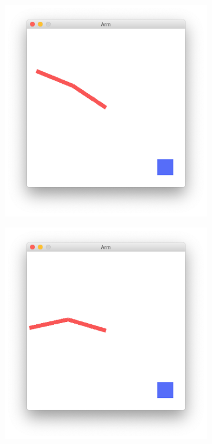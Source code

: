 \documentclass{article}
\begin{document}
\begin{figure}[t]
  \centering
  \begin{subfigure}{.225\textwidth}
    \includegraphics[width=\linewidth]{arm0.png}
  \end{subfigure}
  \begin{subfigure}{.225\textwidth}
    \includegraphics[width=\linewidth]{arm1.png}

\end{subfigure}
\end{figure}
\end{document}
